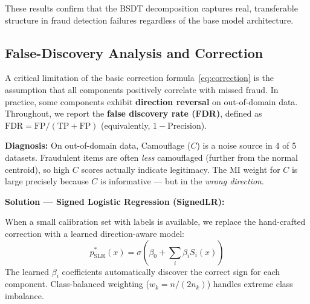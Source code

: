\documentclass[journal]{IEEEtran}
\begin{document}
These results confirm that the BSDT decomposition captures real, transferable structure in fraud detection failures regardless of the base model architecture.

\subsection{False-Discovery Analysis and Correction}
\label{ssec:false_alarm}

A critical limitation of the basic correction formula~\eqref{eq:correction} is the assumption that all components positively correlate with missed fraud. In practice, some components exhibit \textbf{direction reversal} on out-of-domain data. Throughout, we report the \textbf{false discovery rate (FDR)}, defined as $\text{FDR} = \text{FP} / (\text{TP} + \text{FP})$ (equivalently, $1-\text{Precision}$).

\textbf{Diagnosis:} On out-of-domain data, Camouflage ($C$) is a noise source in 4 of 5 datasets. Fraudulent items are often \textit{less} camouflaged (further from the normal centroid), so high $C$ scores actually indicate legitimacy. The MI weight for $C$ is large precisely because $C$ is informative --- but in the \textit{wrong direction}.

\textbf{Solution --- Signed Logistic Regression (SignedLR):}

When a small calibration set with labels is available, we replace the hand-crafted correction with a learned direction-aware model:
\begin{equation}
  p^*_{\text{SLR}}(x) = \sigma\!\left(\beta_0 + \sum_i \beta_i S_i(x)\right)
  \label{eq:slr}
\end{equation}
The learned $\beta_i$ coefficients automatically discover the correct sign for each component. Class-balanced weighting ($w_k = n / (2 n_k)$) handles extreme class imbalance.
\end{document}
